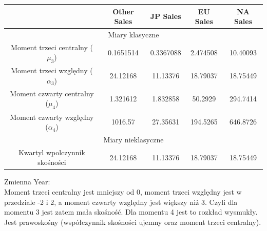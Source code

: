 \documentclass[12pt]{article}
\begin{document}
\begin{table}[h]
	\centering
	\begin{tabular}{|c|c|c|c|c|}
		\hline
		\multicolumn{1}{|l|}{}                              & Other  Sales                           & JP Sales      & EU Sales     & NA Sales         \\ \hline
		\multicolumn{5}{|c|}{Miary klasyczne}                                                                                                           \\ \hline
		\multicolumn{1}{|c|}{Moment trzeci centralny (\(\mu_{3}\))}       & \multicolumn{1}{c|}{\cellcolor[HTML]{FFFFFF}0.1651514}  & \cellcolor[HTML]{FFFFFF}0.3367088& \cellcolor[HTML]{FFFFFF}2.474508& \cellcolor[HTML]{FFFFFF}10.40093 \\ \hline
		\multicolumn{1}{|c|}{Moment trzeci względny (\(\alpha_{3}\))}        & \multicolumn{1}{c|}{\cellcolor[HTML]{FFFFFF}24.12168} & \cellcolor[HTML]{FFFFFF}11.13376& \cellcolor[HTML]{FFFFFF}18.79037& \cellcolor[HTML]{FFFFFF}18.75449 \\ \hline
		\multicolumn{1}{|c|}{Moment czwarty centralny (\(\mu_{4}\))}      & \multicolumn{1}{c|}{\cellcolor[HTML]{FFFFFF}1.321612}  & \cellcolor[HTML]{FFFFFF}1.832858& \cellcolor[HTML]{FFFFFF}50.2929& \cellcolor[HTML]{FFFFFF}294.7414 \\ \hline
		\multicolumn{1}{|c|}{Moment czwarty względny (\(\alpha_{4}\))}       & \multicolumn{1}{c|}{\cellcolor[HTML]{FFFFFF}1016.57}  & \cellcolor[HTML]{FFFFFF}27.35631 & \cellcolor[HTML]{FFFFFF}194.5265& \cellcolor[HTML]{FFFFFF}646.8726\\ \hline
		\multicolumn{5}{|c|}{Miary nieklasyczne}                                                                                                        \\ \hline
		\multicolumn{1}{|c|}{Kwartyl wpolczynnik skośności} & \multicolumn{1}{c|}{\cellcolor[HTML]{FFFFFF}24.12168} & \cellcolor[HTML]{FFFFFF}11.13376 & \cellcolor[HTML]{FFFFFF}18.79037 & \cellcolor[HTML]{FFFFFF}18.75449 \\ \hline
	\end{tabular}
\end{table}
Zmienna Year:\\
Moment trzeci centralny jest mniejszy od 0, moment trzeci względny jest w przedziale -2 i 2, a moment czwarty względny jest większy niż 3. Czyli dla momentu 3 jest zatem mała skośność. Dla momentu 4 jest to rozkład wysmukły. Jest prawoskośny (współczynnik skośności ujemny oraz moment trzeci centralny). \\
\end{document}
